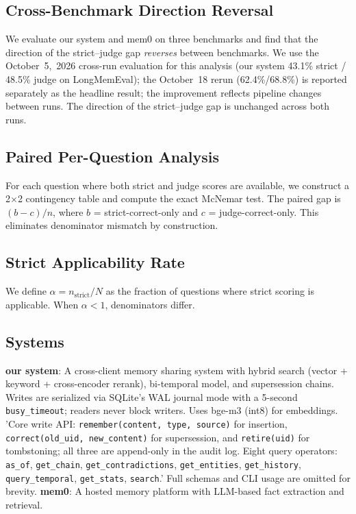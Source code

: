 \documentclass{llncs}
\begin{document}
\subsection{Cross-Benchmark Direction Reversal}
We evaluate our system and mem0 on three benchmarks and find that the direction of the strict--judge gap \emph{reverses} between benchmarks. We use the October~5,~2026 cross-run evaluation for this analysis (our system 43.1\% strict / 48.5\% judge on LongMemEval); the October~18 rerun (62.4\%/68.8\%) is reported separately as the headline result; the improvement reflects pipeline changes between runs. The direction of the strict--judge gap is unchanged across both runs.

\subsection{Paired Per-Question Analysis}
For each question where both strict and judge scores are available, we construct a 2$\times$2 contingency table and compute the exact McNemar test. The paired gap is $(b - c)/n$, where $b$ = strict-correct-only and $c$ = judge-correct-only. This eliminates denominator mismatch by construction.

\subsection{Strict Applicability Rate}
We define $\alpha = n_{\text{strict}}/N$ as the fraction of questions where strict scoring is applicable. When $\alpha < 1$, denominators differ.

\subsection{Systems}
\textbf{our system}: A cross-client memory sharing system with hybrid search (vector + keyword + cross-encoder rerank), bi-temporal model, and supersession chains. Writes are serialized via SQLite's WAL journal mode with a 5-second \texttt{busy\_timeout}; readers never block writers.  Uses bge-m3 (int8) for embeddings. 'Core write API: \texttt{remember(content, type, source)} for insertion, \texttt{correct(old\_uid, new\_content)} for supersession, and \texttt{retire(uid)} for tombstoning; all three are append-only in the audit log. Eight query operators: \texttt{as\_of}, \texttt{get\_chain}, \texttt{get\_contradictions}, \texttt{get\_entities}, \texttt{get\_history}, \texttt{query\_temporal}, \texttt{get\_stats}, \texttt{search}.' Full schemas and CLI usage are omitted for brevity.
\textbf{mem0}: A hosted memory platform with LLM-based fact extraction and retrieval.
\end{document}
